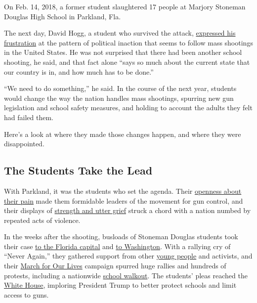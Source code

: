 On Feb. 14, 2018, a former student slaughtered 17 people at Marjory
Stoneman Douglas High School in Parkland, Fla.

The next day, David Hogg, a student who survived the attack,
\href{https://www.nytimes.com/2018/02/15/us/david-hogg-florida-shooting.html}{expressed
his frustration} at the pattern of political inaction that seems to
follow mass shootings in the United States. He was not surprised that
there had been another school shooting, he said, and that fact alone
``says so much about the current state that our country is in, and how
much has to be done.''

``We need to do something,'' he said. In the course of the next year,
students would change the way the nation handles mass shootings,
spurring new gun legislation and school safety measures, and holding to
account the adults they felt had failed them.

Here's a look at where they made those changes happen, and where they
were disappointed.

\hypertarget{the-students-take-the-lead}{%
\subsection{The Students Take the
Lead}\label{the-students-take-the-lead}}

With Parkland, it was the students who set the agenda. Their
\href{https://www.nytimes.com/2018/02/25/us/florida-shooting-parkland-students.html}{openness
about their pain} made them formidable leaders of the movement for gun
control, and their displays of
\href{https://www.nytimes.com/2018/04/04/us/parkland-shooting-yearbook.html}{strength
and utter grief} struck a chord with a nation numbed by repeated acts of
violence.

In the weeks after the shooting, busloads of Stoneman Douglas students
took their case
\href{https://www.nytimes.com/2018/02/20/us/parkland-students-shooting-florida.html}{to
the Florida capital} and
\href{https://www.nytimes.com/2018/02/20/us/parkland-students-shooting-florida.html}{to
Washington}. With a rallying cry of ``Never Again,'' they gathered
support from other
\href{https://www.nytimes.com/2018/02/16/us/columbine-mass-shootings.html}{young
people} and activists, and their
\href{https://www.nytimes.com/2018/03/24/us/politics/students-lead-huge-rallies-for-gun-control-across-the-us.html}{March
for Our Lives} campaign spurred huge rallies and hundreds of protests,
including a nationwide
\href{https://www.nytimes.com/2018/03/14/us/school-walkout.html}{school
walkout}. The students' pleas reached the
\href{https://www.nytimes.com/2018/02/21/us/politics/trump-guns-school-shooting.html}{White
House}, imploring President Trump to better protect schools and limit
access to guns.


